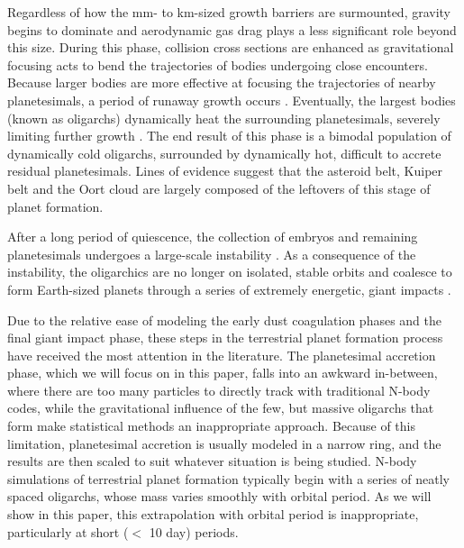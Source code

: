 \documentclass[twocolumn]{aastex63}
\begin{document}
Regardless of how the mm- to km-sized growth barriers are surmounted, gravity begins to dominate and aerodynamic gas drag plays a less significant role beyond this size. During this phase, collision cross sections are enhanced as gravitational focusing \citep{safronov69} acts to bend the trajectories of bodies undergoing close encounters. Because larger bodies are more effective at focusing the trajectories of nearby planetesimals, a period of runaway growth occurs \citep{wetherill89, kokubo96, barnes09}. Eventually, the largest bodies (known as oligarchs) dynamically heat the surrounding planetesimals, severely limiting further growth \citep{kokubo98}. The end result of this phase is a bimodal population of dynamically cold oligarchs, surrounded by dynamically hot, difficult to accrete residual planetesimals. Lines of evidence suggest that the asteroid belt, Kuiper belt and the Oort cloud are largely composed of the leftovers of this stage of planet formation.

After a long period of quiescence, the collection of embryos and
remaining planetesimals undergoes a large-scale instability
\citep{chambers98}.
As a consequence of the instability, the oligarchics are no longer
on isolated, stable orbits and coalesce to form Earth-sized planets
through a series of extremely energetic, giant 
impacts \citep{kokubo02, raymond05, raymond06}.

Due to the relative ease of modeling the early dust coagulation phases
and the final giant impact phase, these steps in the terrestrial
planet formation process have received the most attention in the
literature. The planetesimal accretion phase, which we will focus on
in this paper, falls into an awkward in-between, where there are too
many particles to directly track with traditional N-body codes, while
the gravitational influence of the few, but massive oligarchs that
form make statistical methods an inappropriate approach. Because of
this limitation, planetesimal accretion is usually modeled in a narrow
ring, and the results are then scaled to suit whatever situation is being studied. N-body simulations of terrestrial planet formation typically begin with a series of neatly spaced oligarchs, whose mass varies smoothly with orbital period. As we will show in this paper, this extrapolation with orbital period is inappropriate, particularly at short ($<$ 10 day) periods.
\end{document}
